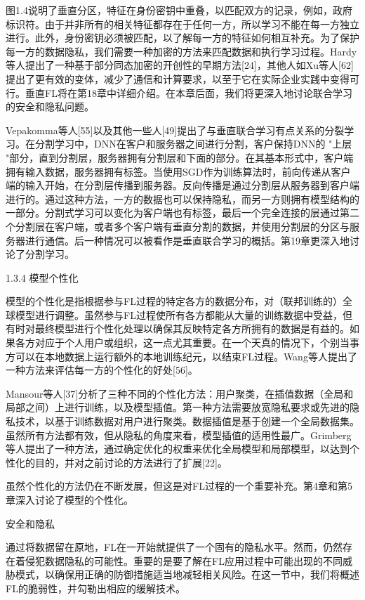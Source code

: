 图1.4说明了垂直分区，特征在身份密钥中重叠，以匹配双方的记录，例如，政府标识符。由于并非所有的相关特征都存在于任何一方，所以学习不能在每一方独立进行。此外，身份密钥必须被匹配，以了解每一方的特征如何相互补充。为了保护每一方的数据隐私，我们需要一种加密的方法来匹配数据和执行学习过程。Hardy等人提出了一种基于部分同态加密的开创性的早期方法[24]，其他人如Xu等人[62]提出了更有效的变体，减少了通信和计算要求，以至于它在实际企业实践中变得可行。垂直FL将在第18章中详细介绍。在本章后面，我们将更深入地讨论联合学习的安全和隐私问题。

Vepakomma等人[55]以及其他一些人[49]提出了与垂直联合学习有点关系的分裂学习。在分割学习中，DNN在客户和服务器之间进行分割，客户保持DNN的 "上层 "部分，直到分割层，服务器拥有分割层和下面的部分。在其基本形式中，客户端拥有输入数据，服务器拥有标签。当使用SGD作为训练算法时，前向传递从客户端的输入开始，在分割层传播到服务器。反向传播是通过分割层从服务器到客户端进行的。通过这种方法，一方的数据也可以保持隐私，而另一方则拥有模型结构的一部分。分割式学习可以变化为客户端也有标签，最后一个完全连接的层通过第二个分割层在客户端，或者多个客户端有垂直分割的数据，并使用分割层的分区与服务器进行通信。后一种情况可以被看作是垂直联合学习的概括。第19章更深入地讨论了分割学习。

1.3.4 模型个性化

模型的个性化是指根据参与FL过程的特定各方的数据分布，对（联邦训练的）全球模型进行调整。虽然参与FL过程使所有各方都能从大量的训练数据中受益，但有时对最终模型进行个性化处理以确保其反映特定各方所拥有的数据是有益的。如果各方对应于个人用户或组织，这一点尤其重要。在一个天真的情况下，个别当事方可以在本地数据上运行额外的本地训练纪元，以结束FL过程。Wang等人提出了一种方法来评估每一方的个性化的好处[56]。

Mansour等人[37]分析了三种不同的个性化方法：用户聚类，在插值数据（全局和局部之间）上进行训练，以及模型插值。第一种方法需要放宽隐私要求或先进的隐私技术，以基于训练数据对用户进行聚类。数据插值是基于创建一个全局数据集。虽然所有方法都有效，但从隐私的角度来看，模型插值的适用性最广。Grimberg等人提出了一种方法，通过确定优化的权重来优化全局模型和局部模型，以达到个性化的目的，并对之前讨论的方法进行了扩展[22]。

虽然个性化的方法仍在不断发展，但这是对FL过程的一个重要补充。第4章和第5章深入讨论了模型的个性化。

安全和隐私

通过将数据留在原地，FL在一开始就提供了一个固有的隐私水平。然而，仍然存在着侵犯数据隐私的可能性。重要的是要了解在FL应用过程中可能出现的不同威胁模式，以确保用正确的防御措施适当地减轻相关风险。在这一节中，我们将概述FL的脆弱性，并勾勒出相应的缓解技术。

